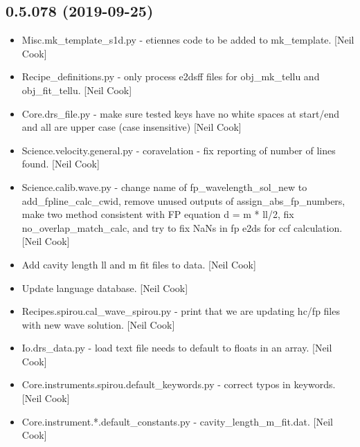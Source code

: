 \documentclass[a4paper,10pt,english]{report}
\begin{document}
\subsection{0.5.078 (2019-09-25)}
\label{\detokenize{misc/changelog:id63}}\begin{itemize}
\item {} 
Misc.mk\_template\_s1d.py - etiennes code to be added to mk\_template.
{[}Neil Cook{]}

\item {} 
Recipe\_definitions.py - only process e2dsff files for obj\_mk\_tellu and
obj\_fit\_tellu. {[}Neil Cook{]}

\item {} 
Core.drs\_file.py - make sure tested keys have no white spaces at
start/end and all are upper case (case insensitive) {[}Neil Cook{]}

\item {} 
Science.velocity.general.py - coravelation - fix reporting of number
of lines found. {[}Neil Cook{]}

\item {} 
Science.calib.wave.py - change name of fp\_wavelength\_sol\_new to
add\_fpline\_calc\_cwid, remove unused outputs of assign\_abs\_fp\_numbers,
make two method consistent with FP equation d = m * ll/2, fix
no\_overlap\_match\_calc, and try to fix NaNs in fp e2ds for ccf
calculation. {[}Neil Cook{]}

\item {} 
Add cavity length ll and m fit files to data. {[}Neil Cook{]}

\item {} 
Update language database. {[}Neil Cook{]}

\item {} 
Recipes.spirou.cal\_wave\_spirou.py - print that we are updating hc/fp
files with new wave solution. {[}Neil Cook{]}

\item {} 
Io.drs\_data.py - load text file needs to default to floats in an
array. {[}Neil Cook{]}

\item {} 
Core.instruments.spirou.default\_keywords.py - correct typos in
keywords. {[}Neil Cook{]}

\item {} 
Core.instrument.*.default\_constants.py - cavity\_length\_m\_fit.dat.
{[}Neil Cook{]}

\end{itemize}
\end{document}
